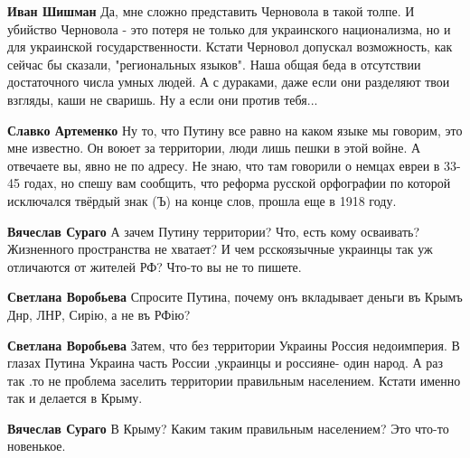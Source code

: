 \begin{itemize}
\begin{itemize}
\textbf{Иван Шишман} Да, мне сложно представить Черновола в такой толпе. И
убийство Черновола - это потеря не только для украинского национализма, но и
для украинской государственности. Кстати Черновол допускал возможность, как
сейчас бы сказали, "региональных языков". Наша общая беда в отсутствии
достаточного числа умных людей. А с дураками, даже если они разделяют твои
взгляды, каши не сваришь. Ну а если они против тебя...


\textbf{Славко Артеменко} Ну то, что Путину все равно на каком языке мы
говорим, это мне известно. Он воюет за территории, люди лишь пешки в этой
войне. А отвечаете вы, явно не по адресу. Не знаю, что там говорили о немцах
евреи в 33-45 годах, но спешу вам сообщить, что реформа русской орфографии по
которой исключался твёрдый знак (Ъ) на конце слов, прошла еще в 1918 году.


\textbf{Вячеслав Сураго} А зачем Путину территории? Что, есть кому осваивать?
Жизненного пространства не хватает? И чем рсскоязычные украинцы так уж
отличаются от жителей РФ? Что-то вы не то пишете.


\textbf{Светлана Воробьева} Спросите Путина, почему онъ вкладывает деньги въ Крымъ Днр, ЛНР, Сирію, а не въ РФію?


\textbf{Светлана Воробьева} Затем, что без территории Украины Россия недоимперия. В глазах Путина Украина часть России ,украинцы и россияне- один народ. А раз так .то не проблема заселить территории правильным населением. Кстати именно так и делается в Крыму.


\textbf{Вячеслав Сураго} В Крыму? Каким таким правильным населением? Это что-то новенькое.



\end{itemize}
\end{itemize}
